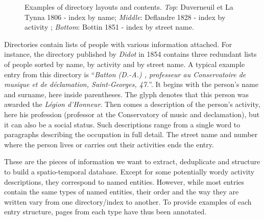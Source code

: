 \begin{figure}[htb!]
	  \caption{\label{fig:directories} Examples of directory layouts and contents. \emph{Top}: Duverneuil et La Tynna 1806 - index by name; \emph{Middle}: Deflandre 1828 - index by activity ; \emph{Bottom}: Bottin 1851 - index by street name.}
\end{figure}


Directories contain lists of people with various information attached.
For instance, the directory published by \emph{Didot} in 1854 contains three redundant lists of people sorted by name, by activity and by street name.
A typical example entry from this directory is ``\textit{Batton (D.-A.) , professeur au Conservatoire de musique et de déclamation, Saint-Georges, 47.}''.
It begins with the person's name and surname, here inside parentheses.
The glyph denotes that this person was awarded the \textit{Légion d'Honneur}.
Then comes a description of the person's activity, here his profession (professor at the Conservatory of music and declamation), but it can also be a social status.
Such descriptions range from a single word to paragraphs describing the occupation in full detail.
The street name and number where the person lives or carries out their activities ends the entry.

These are the pieces of information we want to extract, deduplicate and structure to build a spatio-temporal database.
Except for some potentially wordy activity descriptions, they correspond to named entities. However, while most entries contain the same types of named entities, their order and the way they are written vary from one directory/index to another. To provide examples of each entry structure, pages from each type have thus been annotated. %


